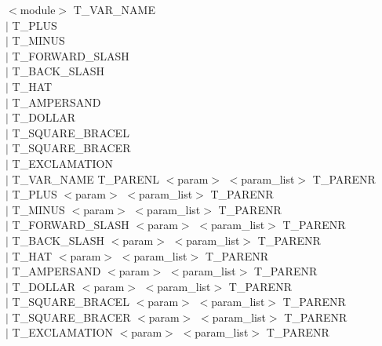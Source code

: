 	\noindent
	$<$module$>$ T\_VAR\_NAME \\
	\hspace{2cm} $|$ T\_PLUS \\ 
	\hspace{2cm} $|$ T\_MINUS \\ 
	\hspace{2cm} $|$ T\_FORWARD\_SLASH\\ 
	\hspace{2cm} $|$ T\_BACK\_SLASH \\ 
	\hspace{2cm} $|$ T\_HAT \\ 
	\hspace{2cm} $|$ T\_AMPERSAND \\ 
	\hspace{2cm} $|$ T\_DOLLAR \\ 
	\hspace{2cm} $|$ T\_SQUARE\_BRACEL \\ 
	\hspace{2cm} $|$ T\_SQUARE\_BRACER \\ 
	\hspace{2cm} $|$ T\_EXCLAMATION \\ 
	\hspace{2cm} $|$ T\_VAR\_NAME T\_PARENL $<$param$>$ $<$param\_list$>$ T\_PARENR\\ 
	\hspace{2cm} $|$ T\_PLUS $<$param$>$ $<$param\_list$>$ T\_PARENR\\ 
	\hspace{2cm} $|$ T\_MINUS $<$param$>$ $<$param\_list$>$ T\_PARENR\\ 
	\hspace{2cm} $|$ T\_FORWARD\_SLASH $<$param$>$ $<$param\_list$>$ T\_PARENR\\ 
	\hspace{2cm} $|$ T\_BACK\_SLASH $<$param$>$ $<$param\_list$>$ T\_PARENR\\ 
	\hspace{2cm} $|$ T\_HAT $<$param$>$ $<$param\_list$>$ T\_PARENR\\ 
	\hspace{2cm} $|$ T\_AMPERSAND $<$param$>$ $<$param\_list$>$ T\_PARENR\\ 
	\hspace{2cm} $|$ T\_DOLLAR $<$param$>$ $<$param\_list$>$ T\_PARENR\\ 
	\hspace{2cm} $|$ T\_SQUARE\_BRACEL $<$param$>$ $<$param\_list$>$ T\_PARENR\\ 
	\hspace{2cm} $|$ T\_SQUARE\_BRACER $<$param$>$ $<$param\_list$>$ T\_PARENR\\ 
	\hspace{2cm} $|$ T\_EXCLAMATION $<$param$>$ $<$param\_list$>$ T\_PARENR\\ 



